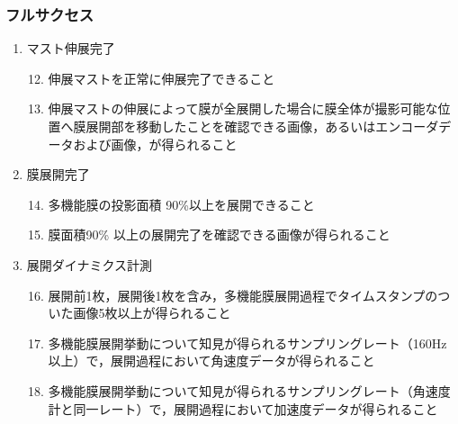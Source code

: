 \subsubsection{フルサクセス}

\begin{enumerate}
	\renewcommand{\labelenumi}{(F\arabic{enumi})}
	\renewcommand{\labelenumii}{(mR-\arabic{enumii})}
\item マスト伸展完了
\begin{enumerate}	
			\setcounter{enumii}{11}
	\item 伸展マストを正常に伸展完了できること
	\item 伸展マストの伸展によって膜が全展開した場合に膜全体が撮影可能な位置へ膜展開部を移動したことを確認できる画像，あるいはエンコーダデータおよび画像，が得られること
\end{enumerate}
\item 膜展開完了
\begin{enumerate}	
				\setcounter{enumii}{13}
	\item 多機能膜の投影面積 90\%以上を展開できること
	\item 膜面積90\% 以上の展開完了を確認できる画像が得られること
\end{enumerate}
\item 展開ダイナミクス計測
\begin{enumerate}	
				\setcounter{enumii}{15}
	\item 展開前1枚，展開後1枚を含み，多機能膜展開過程でタイムスタンプのついた画像5枚以上が得られること
	\item 多機能膜展開挙動について知見が得られるサンプリングレート（160Hz以上）で，展開過程において角速度データが得られること
	\item 多機能膜展開挙動について知見が得られるサンプリングレート（角速度計と同一レート）で，展開過程において加速度データが得られること
\end{enumerate}
\end{enumerate}

